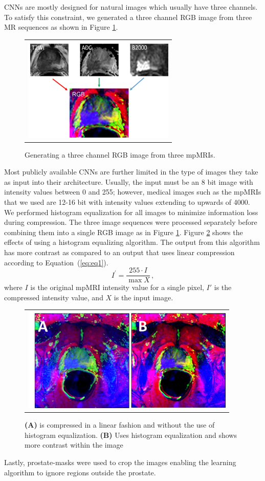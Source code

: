 CNNs are mostly designed for natural images which usually have three channels. To satisfy this constraint, we generated a three channel RGB image from three MR sequences as shown in Figure \ref{fig:Fig2}.
\begin{figure} [ht]
   \begin{center}
   \begin{tabular}{c}
   \includegraphics[height=5cm]{Figure2}
   \end{tabular}
   \end{center}
   \caption[Fig2]
   { \label{fig:Fig2} 
Generating a three channel RGB image from three mpMRIs.}
   \end{figure} 
Most publicly available CNNs are further limited in the type of images they take as input into their architecture. Usually, the input must be an 8 bit image with intensity values between 0 and 255; however, medical images such as the mpMRIs that we used are 12-16 bit with intensity values extending to upwards of 4000. We performed histogram equalization for all images to minimize information loss during compression. The three image sequences were processed separately before combining them into a single RGB image as in Figure \ref{fig:Fig2}. Figure \ref{fig:Fig3} shows the effects of using a histogram equalizing algorithm. The output from this algorithm has more contrast as compared to an output that uses linear compression according to Equation~(\ref{eq:eq1}).
\begin{equation}
\label{eq:eq1}
I^{\prime} = \frac{255\cdot I}{\max{X}}\,,
\end{equation}
where $I$ is the original mpMRI intensity value for a single pixel, $I'$ is the compressed intensity value, and $X$ is the input image.
\begin{figure} [tbh!]
   \begin{center}
   \begin{tabular}{c}
   \includegraphics[height=5cm]{Figure3}
   \end{tabular}
   \end{center}
   \caption[Fig3]
   { \label{fig:Fig3} 
\textbf{(A)} is compressed in a linear fashion and without the use of histogram equalization. 
\textbf{(B)} Uses histogram equalization and shows more contrast within the image}
   \end{figure}
Lastly, prostate-masks were used to crop the images enabling the learning algorithm to ignore regions outside the prostate. 


